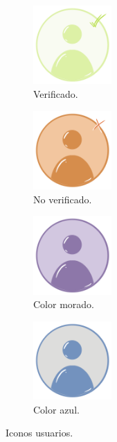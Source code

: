 \documentclass[a4paper, 12pt]{article}
\begin{document}
\begin{figure}[H]
   	\begin{subfigure}{0.48\textwidth}
		\begin{center}
			{\includegraphics[width=3cm]{logo/USERV.png}\par}
			\caption{Verificado.}
		\end{center}  
	\end{subfigure}\hfill
   	\begin{subfigure}{0.48\textwidth}
		\begin{center}
			{\includegraphics[width=3cm]{logo/USERNV.png}\par}
			\caption{No verificado.}
		\end{center}  
	\end{subfigure}\hfill
   	\begin{subfigure}{0.48\textwidth}
		\begin{center}
			{\includegraphics[width=3cm]{logo/ALLUSER.png}\par}
			\caption{Color morado.}
		\end{center}  
	\end{subfigure}\hfill
   	\begin{subfigure}{0.48\textwidth}
		\begin{center}
			{\includegraphics[width=3cm]{logo/USER.png}\par}
			\caption{Color azul.}
		\end{center}  
	\end{subfigure}\hfill
	\caption{Iconos usuarios.}
\end{figure}
\end{document}
